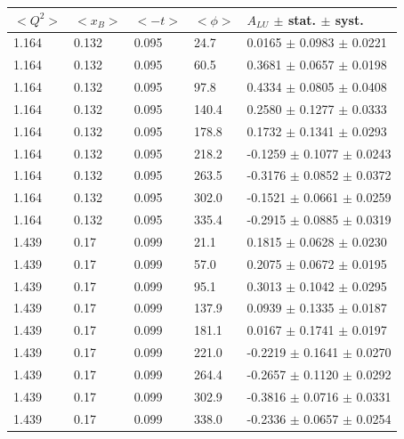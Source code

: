\begin{table}[!h]
   \begin{center}
      \begin{tabular}{||l|l|l|l|l||}
         \hline
 $<Q^{2}>$ & $<x_{B}>$ & $<-t>$ & $<\phi>$ & $A_{LU}$ $\pm$ stat. $\pm$ syst.\\
         \hline

  1.164 & 0.132 & 0.095 & 24.7   &  0.0165   $\pm$ 0.0983    $\pm$   0.0221 \\
  1.164 & 0.132 & 0.095 & 60.5   &  0.3681   $\pm$ 0.0657    $\pm$   0.0198 \\
  1.164 & 0.132 & 0.095 & 97.8   &  0.4334   $\pm$ 0.0805    $\pm$   0.0408 \\
  1.164 & 0.132 & 0.095 & 140.4  &  0.2580   $\pm$ 0.1277    $\pm$   0.0333 \\
  1.164 & 0.132 & 0.095 & 178.8  &  0.1732   $\pm$ 0.1341    $\pm$   0.0293 \\
  1.164 & 0.132 & 0.095 & 218.2  & -0.1259   $\pm$ 0.1077    $\pm$   0.0243 \\
  1.164 & 0.132 & 0.095 & 263.5  & -0.3176   $\pm$ 0.0852    $\pm$   0.0372 \\
  1.164 & 0.132 & 0.095 & 302.0  & -0.1521   $\pm$ 0.0661    $\pm$   0.0259 \\
  1.164 & 0.132 & 0.095 & 335.4  & -0.2915   $\pm$ 0.0885    $\pm$   0.0319 \\
   \hline                                                                     
  1.439 & 0.17 & 0.099 & 21.1    &  0.1815   $\pm$ 0.0628    $\pm$   0.0230 \\
  1.439 & 0.17 & 0.099 &  57.0   &  0.2075   $\pm$ 0.0672    $\pm$   0.0195 \\
  1.439 & 0.17 & 0.099 &  95.1   &  0.3013   $\pm$ 0.1042    $\pm$   0.0295 \\
  1.439 & 0.17 & 0.099 &  137.9  &  0.0939   $\pm$ 0.1335    $\pm$   0.0187 \\
  1.439 & 0.17 & 0.099 &  181.1  &  0.0167   $\pm$ 0.1741    $\pm$   0.0197 \\
  1.439 & 0.17 & 0.099 &  221.0  & -0.2219   $\pm$ 0.1641    $\pm$   0.0270 \\
  1.439 & 0.17 & 0.099 &  264.4  & -0.2657   $\pm$ 0.1120    $\pm$   0.0292 \\
  1.439 & 0.17 & 0.099 &  302.9  & -0.3816   $\pm$ 0.0716    $\pm$   0.0331 \\
  1.439 & 0.17 & 0.099 &  338.0  & -0.2336   $\pm$ 0.0657    $\pm$   0.0254 \\

\end{tabular}
\end{center}
\end{table}
